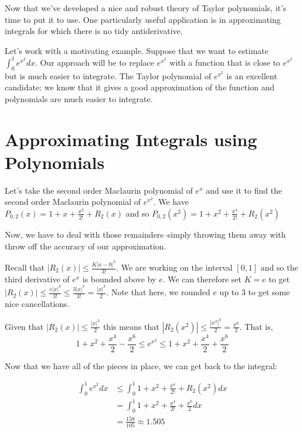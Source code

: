 \documentclass[
]{book}
\theoremstyle{definition}
\theoremstyle{definition}
\theoremstyle{definition}
\theoremstyle{definition}
\theoremstyle{remark}
\begin{document}
Now that we've developed a nice and robust theory of Taylor polynomials, it's time to put it to use. One particularly useful application is in approximating integrals for which there is no tidy antiderivative.

Let's work with a motivating example. Suppose that we want to estimate \(\displaystyle \int_0^1 e^{x^2}dx\). Our approach will be to replace \(e^{x^2}\) with a function that is close to \(e^{x^2}\) but is much easier to integrate. The Taylor polynomial of \(e^{x^2}\) is an excellent candidate: we know that it gives a good approximation of the function and polynomials are much easier to integrate.

\hypertarget{approximating-integrals-using-polynomials}{%
\section{Approximating Integrals using Polynomials}\label{approximating-integrals-using-polynomials}}

Let's take the second order Maclaurin polynomial of \(e^x\) and use it to find the second order Maclaurin polynomial of \(e^{x^2}\). We have \(P_{0,2}(x)=1+x+\frac{x^2}{2!}+R_2(x)\) and so \(P_{0,2}(x^2)=1+x^2+\frac{x^4}{2!}+R_2(x^2)\)

Now, we have to deal with those remainders--simply throwing them away with throw off the accuracy of our approximation.

Recall that \(\displaystyle |R_2(x)|\leq \frac{K|x-0|^3}{3!}\). We are working on the interval \([0,1]\) and so the third derivative of \(e^x\) is bounded above by \(e\). We can therefore set \(K=e\) to get \(\displaystyle |R_2(x)|\leq \frac{e|x|^3}{3!}\leq \frac{3|x|^3}{3!} = \frac{|x|^3}{2}\). Note that here, we rounded \(e\) up to \(3\) to get some nice cancellations.

Given that \(\displaystyle |R_2(x)|\leq\frac{|x|^3}{2}\) this means that \(\displaystyle |R_2(x^2)|\leq\frac{|x^2|^3}{2}=\frac{x^6}{2}\). That is, \[1+x^2+\frac{x^4}{2}-\frac{x^6}{2}\leq e^{x^2}\leq 1+x^2+\frac{x^4}{2}+\frac{x^6}{2}\]

Now that we have all of the pieces in place, we can get back to the integral:

\begin{align*}
 \int_0^1 e^{x^2}dx & \leq \int_0^1 1+x^2+\frac{x^4}{2!}+R_2(x^2) dx \\
&= \int_0^1 1+x^2+\frac{x^4}{2!}+\frac{x^6}{2} dx\\
&= \frac{158}{105} \approx 1.505\\
\end{align*}
\end{document}
